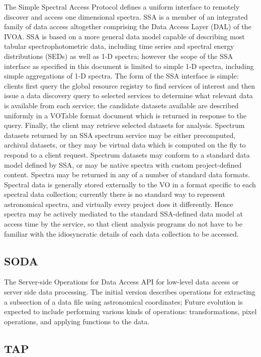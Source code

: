 \documentclass[11pt,a4paper]{ivoa}
\begin{document}
The Simple Spectral Access Protocol defines a uniform interface to remotely discover and 
access one dimensional spectra. SSA is a member of an integrated family of data access 
altogether comprising the Data Access Layer (DAL) of the IVOA. SSA is based on a more 
general data model capable of describing most tabular spectrophotometric data, including 
time series and spectral energy distributions (SEDs) as well as 1-D spectra; however the 
scope of the SSA interface as specified in this document is limited to simple 1-D spectra,
including simple aggregations of 1-D spectra. The form of the SSA interface is simple: 
clients first query the global resource registry to find services of interest and then 
issue a data discovery query to selected services to determine what relevant data is 
available from each service; the candidate datasets available are described uniformly 
in a VOTable format document which is returned in response to the query. Finally, the 
client may retrieve selected datasets for analysis. Spectrum datasets returned by an SSA 
spectrum service may be either precomputed, archival datasets, or they may be virtual 
data which is computed on the fly to respond to a client request. Spectrum datasets may 
conform to a standard data model defined by SSA, or may be native spectra with custom 
project-defined content. Spectra may be returned in any of a number of standard data 
formats. Spectral data is generally stored externally to the VO in a format specific to 
each spectral data collection; currently there is no standard way to represent astronomical 
spectra, and virtually every project does it differently. Hence spectra may be actively 
mediated to the standard SSA-defined data model at access time by the service, so that 
client analysis programs do not have to be familiar with the idiosyncratic details of each 
data collection to be accessed. 

\subsection{SODA} 

The Server-side Operations for Data Access API for low-level data access or server side 
data processing. The initial version describes operations for extracting a subsection of a data
file using astronomical coordinates; Future evolution is expected to include performing 
various kinds of operations: transformations, pixel operations, and applying functions to the data.

\subsection{TAP}
\end{document}
